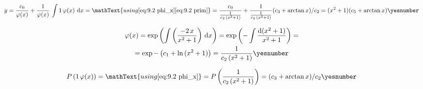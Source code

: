 \documentclass["AM3C-Slides_annotations.tex"]{subfiles}
\begin{document}
\begin{exampleBox}
  \begin{gather*}
    y
    = \frac{c_0}{\varphi(x)}
    + \frac{1  }{\varphi(x)}
    \,\int{1\,\varphi(x)\,\odif{x}}
    = \mathText{using 
      \eqref{eq:9.2 phi_x}
      \eqref{eq:9.2 prim}
    }
    = \frac{c_0}{\frac{1}{c_2\,(x^2+1)}}
    + \frac{1  }{\frac{1}{c_2\,(x^2+1)}}
      (c_3 + \arctan{x})/c_2
    = (x^2+1)(c_5 + \arctan{x})
    \yesnumber\label{eq:9.2 answer}
  \end{gather*}

  \begin{gather*}
    \varphi(x) 
    = \exp{\left(
      \int{\left(\frac{-2\,x}{x^2+1}\right)\,\odif{x}}
    \right)}
    = \exp{\left(
        -\int{\frac{\odif{(x^2+1)}}{x^2+1}}
    \right)}
    = \\
    = \exp{-\left(
        c_1 + \ln{(x^2+1)}
    \right)}
    = \frac{1}{c_2\,(x^2+1)}
    \yesnumber\label{eq:9.2 phi_x}
  \end{gather*}

  \begin{gather*}
    P\left(
      1\,\varphi(x)
    \right)
    = \mathText{using \eqref{eq:9.2 phi_x}}
    = P\left(
      \frac{1}{c_2\,(x^2+1)}
    \right)
    = (c_3 + \arctan{x})/c_2
    \yesnumber\label{eq:9.2 prim}
  \end{gather*}

\end{exampleBox}
\end{document}
